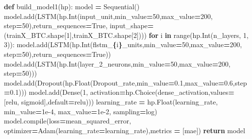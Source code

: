 \documentclass[
]{article}
\newenvironment{Shaded}{\begin{snugshade}}{\end{snugshade}}
\newcommand{\BuiltInTok}[1]{#1}
\newcommand{\ControlFlowTok}[1]{\textcolor[rgb]{0.13,0.29,0.53}{\textbf{#1}}}
\newcommand{\DecValTok}[1]{\textcolor[rgb]{0.00,0.00,0.81}{#1}}
\newcommand{\FloatTok}[1]{\textcolor[rgb]{0.00,0.00,0.81}{#1}}
\newcommand{\KeywordTok}[1]{\textcolor[rgb]{0.13,0.29,0.53}{\textbf{#1}}}
\newcommand{\NormalTok}[1]{#1}
\newcommand{\OperatorTok}[1]{\textcolor[rgb]{0.81,0.36,0.00}{\textbf{#1}}}
\newcommand{\SpecialCharTok}[1]{\textcolor[rgb]{0.81,0.36,0.00}{\textbf{#1}}}
\newcommand{\SpecialStringTok}[1]{\textcolor[rgb]{0.31,0.60,0.02}{#1}}
\newcommand{\StringTok}[1]{\textcolor[rgb]{0.31,0.60,0.02}{#1}}
\newcommand{\VariableTok}[1]{\textcolor[rgb]{0.00,0.00,0.00}{#1}}
\begin{document}
\begin{Shaded}
\begin{Highlighting}[]
\KeywordTok{def}\NormalTok{ build\_model1(hp):}
\NormalTok{    model }\OperatorTok{=}\NormalTok{ Sequential()}
\NormalTok{    model.add(LSTM(hp.Int(}\StringTok{\textquotesingle{}input\_unit\textquotesingle{}}\NormalTok{,min\_value}\OperatorTok{=}\DecValTok{50}\NormalTok{,max\_value}\OperatorTok{=}\DecValTok{200}\NormalTok{, step}\OperatorTok{=}\DecValTok{50}\NormalTok{),return\_sequences}\OperatorTok{=}\VariableTok{True}\NormalTok{, input\_shape}\OperatorTok{=}\NormalTok{(trainX\_BTC.shape[}\DecValTok{1}\NormalTok{],trainX\_BTC.shape[}\DecValTok{2}\NormalTok{])))}
    \ControlFlowTok{for}\NormalTok{ i }\KeywordTok{in} \BuiltInTok{range}\NormalTok{(hp.Int(}\StringTok{\textquotesingle{}n\_layers\textquotesingle{}}\NormalTok{, }\DecValTok{1}\NormalTok{, }\DecValTok{3}\NormalTok{)):}
\NormalTok{        model.add(LSTM(hp.Int(}\SpecialStringTok{f\textquotesingle{}lstm\_}\SpecialCharTok{\{}\NormalTok{i}\SpecialCharTok{\}}\SpecialStringTok{\_units\textquotesingle{}}\NormalTok{,min\_value}\OperatorTok{=}\DecValTok{50}\NormalTok{,max\_value}\OperatorTok{=}\DecValTok{200}\NormalTok{, step}\OperatorTok{=}\DecValTok{50}\NormalTok{),return\_sequences}\OperatorTok{=}\VariableTok{True}\NormalTok{))}
\NormalTok{    model.add(LSTM(hp.Int(}\StringTok{\textquotesingle{}layer\_2\_neurons\textquotesingle{}}\NormalTok{,min\_value}\OperatorTok{=}\DecValTok{50}\NormalTok{,max\_value}\OperatorTok{=}\DecValTok{200}\NormalTok{, step}\OperatorTok{=}\DecValTok{50}\NormalTok{)))}
\NormalTok{    model.add(Dropout(hp.Float(}\StringTok{\textquotesingle{}Dropout\_rate\textquotesingle{}}\NormalTok{,min\_value}\OperatorTok{=}\FloatTok{0.1}\NormalTok{,max\_value}\OperatorTok{=}\FloatTok{0.6}\NormalTok{,step}\OperatorTok{=}\FloatTok{0.1}\NormalTok{)))}
\NormalTok{    model.add(Dense(}\DecValTok{1}\NormalTok{, activation}\OperatorTok{=}\NormalTok{hp.Choice(}\StringTok{\textquotesingle{}dense\_activation\textquotesingle{}}\NormalTok{,values}\OperatorTok{=}\NormalTok{[}\StringTok{\textquotesingle{}relu\textquotesingle{}}\NormalTok{, }\StringTok{\textquotesingle{}sigmoid\textquotesingle{}}\NormalTok{],default}\OperatorTok{=}\StringTok{\textquotesingle{}relu\textquotesingle{}}\NormalTok{)))}
\NormalTok{    learning\_rate }\OperatorTok{=}\NormalTok{ hp.Float(}\StringTok{\textquotesingle{}learning\_rate\textquotesingle{}}\NormalTok{, min\_value}\OperatorTok{=}\FloatTok{1e{-}4}\NormalTok{, max\_value}\OperatorTok{=}\FloatTok{1e{-}2}\NormalTok{, sampling}\OperatorTok{=}\StringTok{\textquotesingle{}log\textquotesingle{}}\NormalTok{)}
\NormalTok{    model.}\BuiltInTok{compile}\NormalTok{(loss}\OperatorTok{=}\StringTok{\textquotesingle{}mean\_squared\_error\textquotesingle{}}\NormalTok{, optimizer}\OperatorTok{=}\NormalTok{Adam(learning\_rate}\OperatorTok{=}\NormalTok{learning\_rate),metrics }\OperatorTok{=}\NormalTok{ [}\StringTok{\textquotesingle{}mae\textquotesingle{}}\NormalTok{])}
    \ControlFlowTok{return}\NormalTok{ model}
\end{Highlighting}
\end{Shaded}
\end{document}
